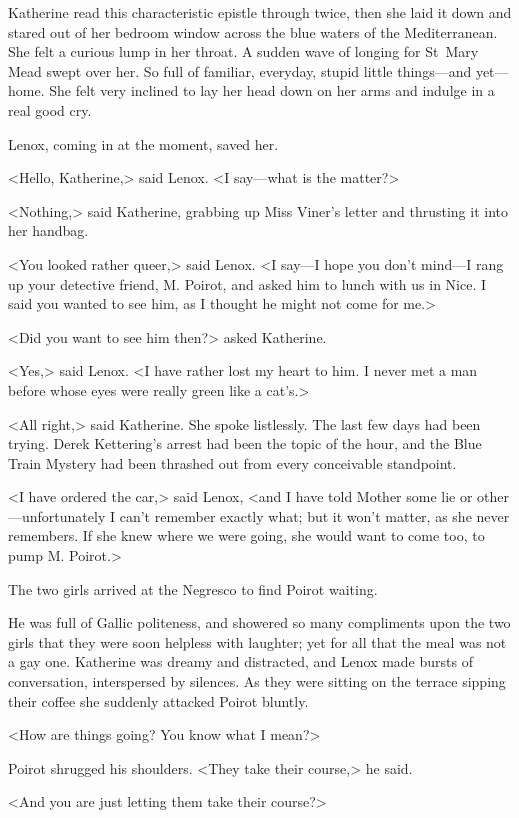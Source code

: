 Katherine read this characteristic epistle through twice, then she laid it down and stared out of her bedroom window across the blue waters of the Mediterranean. She felt a curious lump in her throat. A sudden wave of longing for St~Mary Mead swept over her. So full of familiar, everyday, stupid little things—and yet—home. She felt very inclined to lay her head down on her arms and indulge in a real good cry.

Lenox, coming in at the moment, saved her.

<Hello, Katherine,> said Lenox. <I say—what is the matter?>

<Nothing,> said Katherine, grabbing up Miss Viner's letter and thrusting it into her handbag.

<You looked rather queer,> said Lenox. <I say—I hope you don't mind—I rang up your detective friend, M. Poirot, and asked him to lunch with us in Nice. I said you wanted to see him, as I thought he might not come for me.>

<Did you want to see him then?> asked Katherine.

<Yes,> said Lenox. <I have rather lost my heart to him. I never met a man before whose eyes were really green like a cat's.>

<All right,> said Katherine. She spoke listlessly. The last few days had been trying. Derek Kettering's arrest had been the topic of the hour, and the Blue Train Mystery had been thrashed out from every conceivable standpoint.

<I have ordered the car,> said Lenox, <and I have told Mother some lie or other—unfortunately I can't remember exactly what; but it won't matter, as she never remembers. If she knew where we were going, she would want to come too, to pump M. Poirot.>

The two girls arrived at the Negresco to find Poirot waiting.

He was full of Gallic politeness, and showered so many compliments upon the two girls that they were soon helpless with laughter; yet for all that the meal was not a gay one. Katherine was dreamy and distracted, and Lenox made bursts of conversation, interspersed by silences. As they were sitting on the terrace sipping their coffee she suddenly attacked Poirot bluntly.

<How are things going? You know what I mean?>

Poirot shrugged his shoulders. <They take their course,> he said.

<And you are just letting them take their course?>

